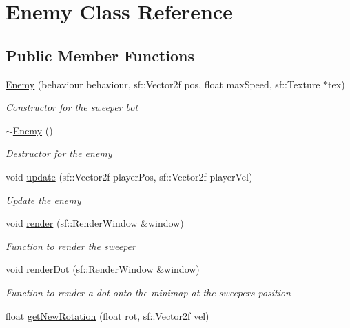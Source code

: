 \hypertarget{class_enemy}{}\section{Enemy Class Reference}
\label{class_enemy}
\subsection*{Public Member Functions}
\begin{DoxyCompactItemize}
\item 
\mbox{\hyperlink{class_enemy_ae98e4e8aeb959fa33b2f956b116fbae3}{Enemy}} (behaviour behaviour, sf\+::\+Vector2f pos, float max\+Speed, sf\+::\+Texture $\ast$tex)
\begin{DoxyCompactList}\small\item\em Constructor for the sweeper bot \end{DoxyCompactList}\item 
\mbox{\hyperlink{class_enemy_ac0eec4755e28c02688065f9657150ac3}{$\sim$\+Enemy}} ()
\begin{DoxyCompactList}\small\item\em Destructor for the enemy \end{DoxyCompactList}\item 
void \mbox{\hyperlink{class_enemy_a7101d7b18d9f9f50dbcf3ced525ec7f4}{update}} (sf\+::\+Vector2f player\+Pos, sf\+::\+Vector2f player\+Vel)
\begin{DoxyCompactList}\small\item\em Update the enemy \end{DoxyCompactList}\item 
void \mbox{\hyperlink{class_enemy_adce121a5d559e9d666d7f88c7a26dc1f}{render}} (sf\+::\+Render\+Window \&window)
\begin{DoxyCompactList}\small\item\em Function to render the sweeper \end{DoxyCompactList}\item 
void \mbox{\hyperlink{class_enemy_a5bd77160e8d13c04b4bf4dae537ada9e}{render\+Dot}} (sf\+::\+Render\+Window \&window)
\begin{DoxyCompactList}\small\item\em Function to render a dot onto the minimap at the sweepers position \end{DoxyCompactList}\item 
float \mbox{\hyperlink{class_enemy_ae7981b82c023a8c6884c52df3f9e3125}{get\+New\+Rotation}} (float rot, sf\+::\+Vector2f vel)

\end{DoxyCompactItemize}

